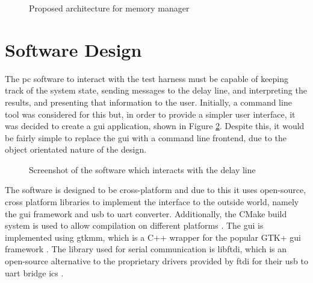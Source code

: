 \begin{figure}[ht]
	\caption{Proposed architecture for memory manager}
	\label{fig:mem-manager-arch}
\end{figure}

\section{Software Design}  \label{sec:test-harness-sw}

The \gls{pc} software to interact with the test harness must be capable of keeping track of the system state, sending messages to the delay line, and interpreting the results, and presenting that information to the user. Initially, a command line tool was considered for this but, in order to provide a simpler user interface, it was decided to create a \gls{gui} application, shown in Figure \ref{fig:mem-gui-screenshot}. Despite this, it would be fairly simple to replace the \gls{gui} with a command line frontend, due to the object orientated nature of the design.

\begin{figure}[ht]
	\centering
	\caption{Screenshot of the software which interacts with the delay line}
	\label{fig:mem-gui-screenshot}
\end{figure}

The software is designed to be cross-platform and due to this it uses open-source, cross platform libraries to implement the interface to the outside world, namely the \gls{gui} framework and \gls{usb} to \gls{uart} converter. Additionally, the CMake build system is used to allow compilation on different platforms \cite{cmake2017}. The \gls{gui} is implemented using gtkmm, which is a C++ wrapper for the popular GTK+ \gls{gui} framework \cite{cumming2017}. The library used for serial communication is libftdi, which is an open-source alternative to the proprietary drivers provided by \gls{ftdi} for their \gls{usb} to \gls{uart} bridge \glspl{ic} \cite{intra2net2017}.

